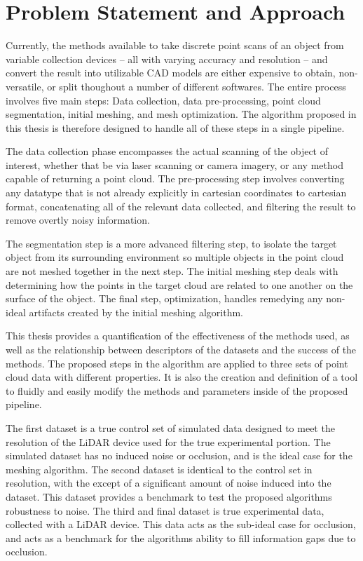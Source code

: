 \documentclass[12pt]{drexelthesis}
\let\Oldsection\section
\renewcommand{\section}{\FloatBarrier\Oldsection}
\begin{document}
\section{Problem Statement and Approach}
Currently, the methods available to take discrete point scans of an object from variable collection devices -- all with varying accuracy and resolution -- and convert the result into utilizable CAD models are either expensive to obtain, non-versatile, or split thoughout a number of different softwares. The entire process involves five main steps: Data collection, data pre-processing, point cloud segmentation, initial meshing, and mesh optimization. The algorithm proposed in this thesis is therefore designed to handle all of these steps in a single pipeline.

The data collection phase encompasses the actual scanning of the object of interest, whether that be via laser scanning or camera imagery, or any method capable of returning a point cloud. The pre-processing step involves converting any datatype that is not already explicitly in cartesian coordinates to cartesian format, concatenating all of the relevant data collected, and filtering the result to remove overtly noisy information.

The segmentation step is a more advanced filtering step, to isolate the target object from its surrounding environment so multiple objects in the point cloud are not meshed together in the next step. The initial meshing step deals with determining how the points in the target cloud are related to one another on the surface of the object. The final step, optimization, handles remedying any non-ideal artifacts created by the initial meshing algorithm.

This thesis provides a quantification of the effectiveness of the methods used, as well as the relationship between descriptors of the datasets and  the success of the methods. The proposed steps in the algorithm are applied to three sets of point cloud data with different properties. It is also the creation and definition of a tool to fluidly and easily modify the methods and parameters inside of the proposed pipeline.

The first dataset is a true control set of simulated data designed to meet the resolution of the LiDAR device used for the true experimental portion. The simulated dataset has no induced noise or occlusion, and is the ideal case for the meshing algorithm. The second dataset is identical to the control set in resolution, with the except of a significant amount of noise induced into the dataset. This dataset provides a benchmark to test the proposed algorithms robustness to noise. The third and final dataset is true experimental data, collected with a LiDAR device. This data acts as the sub-ideal case for occlusion, and acts as a benchmark for the algorithms ability to fill information gaps due to occlusion.
\end{document}
